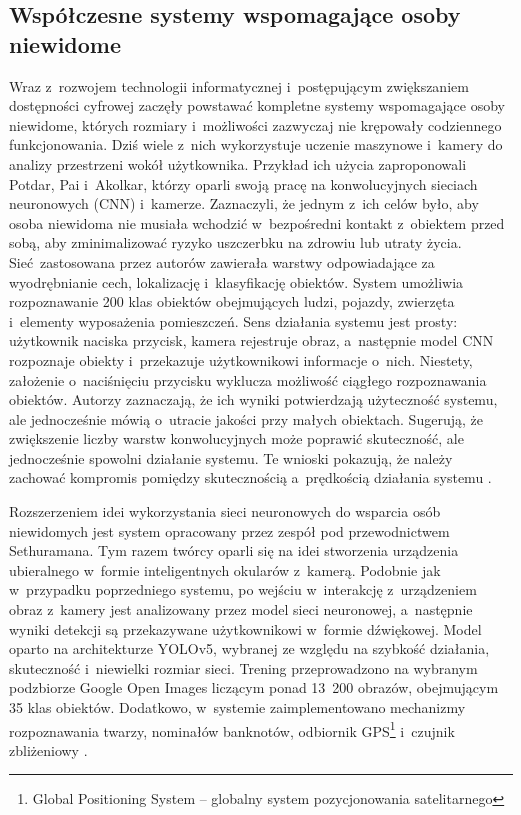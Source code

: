 \subsection{Współczesne systemy wspomagające osoby niewidome}
\label{ssec:systemy}

Wraz z~rozwojem technologii informatycznej i~postępującym zwiększaniem dostępności cyfrowej zaczęły powstawać kompletne systemy wspomagające osoby niewidome, których rozmiary i~możliwości zazwyczaj nie krępowały codziennego funkcjonowania. Dziś wiele z~nich wykorzystuje uczenie maszynowe i~kamery do analizy przestrzeni wokół użytkownika. Przykład ich użycia zaproponowali Potdar, Pai i~Akolkar, którzy oparli swoją pracę na konwolucyjnych sieciach neuronowych (CNN) i~kamerze. Zaznaczyli, że jednym z~ich celów było, aby osoba niewidoma nie musiała wchodzić w~bezpośredni kontakt z~obiektem przed sobą, aby zminimalizować ryzyko uszczerbku na zdrowiu lub utraty życia. Sieć~zastosowana przez autorów zawierała warstwy odpowiadające za wyodrębnianie cech, lokalizację i~klasyfikację obiektów. System umożliwia rozpoznawanie 200 klas obiektów obejmujących ludzi, pojazdy, zwierzęta i~elementy wyposażenia pomieszczeń. Sens działania systemu jest prosty: użytkownik naciska przycisk, kamera rejestruje obraz, a~następnie model CNN rozpoznaje obiekty i~przekazuje użytkownikowi informacje o~nich. Niestety, założenie o~naciśnięciu przycisku wyklucza możliwość ciągłego rozpoznawania obiektów. Autorzy zaznaczają, że ich wyniki potwierdzają użyteczność systemu, ale jednocześnie mówią o~utracie jakości przy małych obiektach. Sugerują, że zwiększenie liczby warstw konwolucyjnych może poprawić skuteczność, ale jednocześnie spowolni działanie systemu. Te wnioski pokazują, że należy zachować kompromis pomiędzy skutecznością a~prędkością działania systemu \cite{bib:cnnBlindAid}.

Rozszerzeniem idei wykorzystania sieci neuronowych do wsparcia osób niewidomych jest system  opracowany przez zespół pod przewodnictwem Sethuramana. Tym razem twórcy oparli się na idei stworzenia urządzenia ubieralnego w~formie inteligentnych okularów z~kamerą. Podobnie jak w~przypadku poprzedniego systemu, po wejściu w~interakcję z~urządzeniem obraz z~kamery jest analizowany przez model sieci neuronowej, a~następnie wyniki detekcji są przekazywane użytkownikowi w~formie dźwiękowej. Model oparto na architekturze YOLOv5, wybranej ze względu na szybkość działania, skuteczność i~niewielki rozmiar sieci. Trening przeprowadzono na wybranym podzbiorze Google Open Images liczącym ponad 13~200 obrazów, obejmującym 35 klas obiektów. Dodatkowo, w~systemie zaimplementowano mechanizmy rozpoznawania twarzy, nominałów banknotów, odbiornik GPS\footnote{Global Positioning System -- globalny system pozycjonowania satelitarnego} i~czujnik zbliżeniowy \cite{bib:magiceye}.

